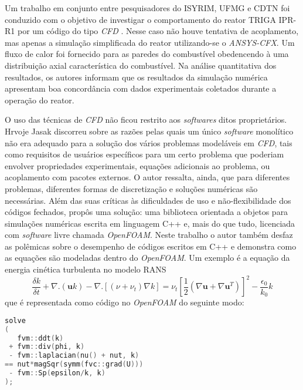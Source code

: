 Um trabalho em conjunto entre pesquisadores do ISYRIM, UFMG e CDTN foi conduzido
com o objetivo de investigar o comportamento do reator TRIGA IPR-R1 por um código do tipo \textit{CFD} \cite{Martinez2012}. 
Nesse caso não houve tentativa de acoplamento, mas apenas a simulação simplificada 
do reator utilizando-se o \textit{ANSYS-CFX}. Um fluxo de calor 
foi fornecido para as paredes do combustível obedencendo à uma distribuição axial 
característica do combustível. Na análise quantitativa dos resultados, os autores 
informam que os resultados da simulação numérica apresentam boa concordância com 
dados experimentais coletados durante a operação do reator.

O uso das técnicas de \textit{CFD} não ficou restrito aos \textit{softwares} ditos proprietários.
Hrvoje Jasak discorreu sobre as razões pelas quais um único \textit{software} monolítico
não era adequado para a solução dos vários problemas modeláveis em \textit{CFD}, tais como requisitos
de usuários específicos para um certo problema que poderiam envolver propriedades
experimentais, equações adicionais ao problema, ou acoplamento com pacotes externos.
O autor ressalta, ainda, que para diferentes problemas, diferentes formas de discretização
e soluções numéricas são necessárias. Além das suas críticas às dificuldades de uso e
não-flexibilidade dos códigos fechados, propôs uma solução: uma biblioteca
orientada a objetos para simulações numéricas escrita em linguagem C++ e, mais do que tudo,
licenciada com \textit{software} livre \cite{Jasak2007} chamada \textit{OpenFOAM}.
Neste trabalho o autor também desfaz as polêmicas sobre o desempenho de códigos escritos
em C++ e demonstra como as equações são modeladas dentro do \textit{OpenFOAM}. Um
exemplo é a equação da energia cinética turbulenta no modelo RANS
\begin{equation}
  \frac{\delta k}{\delta t} + \nabla . (\mathbf{u}k) - \nabla . [(\nu + \nu_{t})
    \nabla k] = \nu_t \left[ \frac{1}{2}(\nabla \mathbf{u} + \nabla \mathbf{u}^T)\right]^2 - \frac{\epsilon_0}{k_0}k
\end{equation}
que é representada como código no \textit{OpenFOAM} do seguinte modo:
\begin{lstlisting}[language=c++]
solve
(
   fvm::ddt(k)
 + fvm::div(phi, k)
 - fvm::laplacian(nu() + nut, k)
== nut*magSqr(symm(fvc::grad(U)))
 - fvm::Sp(epsilon/k, k)
);  
\end{lstlisting}

